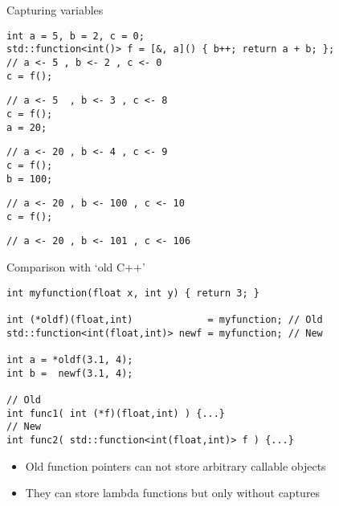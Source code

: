 \documentclass[10pt]{beamer}
\begin{document}
\begin{frame}[fragile,label={sec:org2483391}]{Capturing variables}
 \begin{verbatim}
int a = 5, b = 2, c = 0;
std::function<int()> f = [&, a]() { b++; return a + b; };
// a <- 5 , b <- 2 , c <- 0
c = f();
\end{verbatim}
\pause
\begin{verbatim}
// a <- 5  , b <- 3 , c <- 8
c = f();
a = 20;
\end{verbatim}
\pause
\begin{verbatim}
// a <- 20 , b <- 4 , c <- 9
c = f();
b = 100;
\end{verbatim}
\pause
\begin{verbatim}
// a <- 20 , b <- 100 , c <- 10
c = f();
\end{verbatim}
\pause
\begin{verbatim}
// a <- 20 , b <- 101 , c <- 106
\end{verbatim}
\end{frame}

\begin{frame}[fragile,label={sec:org8d5c8ec}]{Comparison with `old C++'}
 \begin{verbatim}
int myfunction(float x, int y) { return 3; }

int (*oldf)(float,int)             = myfunction; // Old
std::function<int(float,int)> newf = myfunction; // New

int a = *oldf(3.1, 4);
int b =  newf(3.1, 4);

// Old
int func1( int (*f)(float,int) ) {...}
// New
int func2( std::function<int(float,int)> f ) {...}
\end{verbatim}
\begin{itemize}
\item Old function pointers can \alert{\alert{not}} store arbitrary \alert{callable} objects
\item They can store lambda functions but only \alert{\alert{without}} captures
\end{itemize}
\end{frame}
\end{document}
